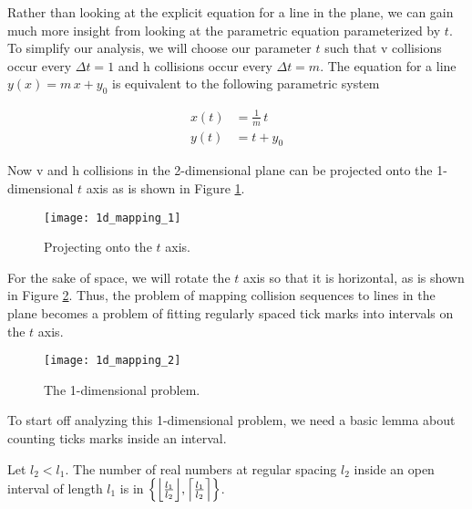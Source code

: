 
Rather than looking at the explicit equation for a line in the plane, we can gain much more insight from looking at the parametric equation parameterized by $t$. To simplify our analysis, we will choose our parameter $t$ such that v collisions occur every $\Delta t = 1$ and h collisions occur every $\Delta t = m$. The equation for a line $y(x) = m \, x + y_0$ is equivalent to the following parametric system

\begin{align}\label{eq:parametric-line}
	x(t)& = \frac{1}{m} \, t\\
	y(t)& = t + y_0
\end{align}

Now v and h collisions in the 2-dimensional plane can be projected onto the 1-dimensional $t$ axis as is shown in Figure \ref{fig:1d-projection}. 

\begin{figure}[H]
  \begin{center}
    \texttt{[image: 1d\_mapping\_1]}
  \end{center}
  \vspace{-.2in} %
  \caption{\label{fig:1d-projection} Projecting onto the $t$ axis.}
\end{figure}

For the sake of space, we will rotate the $t$ axis so that it is horizontal, as is shown in Figure \ref{fig:1d-problem}. Thus, the problem of mapping collision sequences to lines in the plane becomes a problem of fitting regularly spaced tick marks into intervals on the $t$ axis.

\begin{figure}[H]
  \begin{center}
    \texttt{[image: 1d\_mapping\_2]}
  \end{center}
  \vspace{-.2in} %
  \caption{\label{fig:1d-problem} The 1-dimensional problem.}
\end{figure}


To start off analyzing this 1-dimensional problem, we need a basic lemma about counting ticks marks inside an interval.

\begin{lemma}\label{lem:interval-ticks}
	Let $l_2 < l_1$. The number of real numbers at regular spacing $l_2$ inside an open interval of length $l_1$ is in $\cbracket{\floor{\frac{l_1}{l_2}}, \ceil{\frac{l_1}{l_2}}}$.
\end{lemma}

